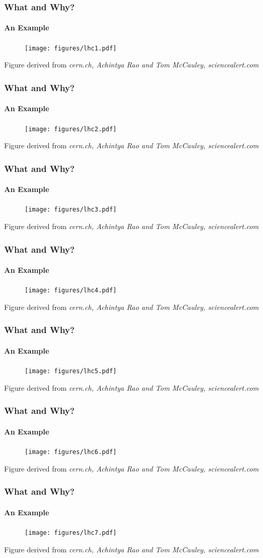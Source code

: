 \documentclass[9pt]{beamer}
\begin{document}
\begin{frame}
\frametitle{What and Why?}
\framesubtitle{An Example}
	\begin{figure}
	\texttt{[image: figures/lhc1.pdf]}
\end{figure}
\tiny Figure derived from \textit{cern.ch, Achintya Rao and Tom McCauley, sciencealert.com}
\end{frame}
\begin{frame}
\frametitle{What and Why?}
\framesubtitle{An Example}
\begin{figure}
	\texttt{[image: figures/lhc2.pdf]}
\end{figure}
\tiny Figure derived from \textit{cern.ch, Achintya Rao and Tom McCauley, sciencealert.com}
\end{frame}
\begin{frame}
\frametitle{What and Why?}
\framesubtitle{An Example}
\begin{figure}
\texttt{[image: figures/lhc3.pdf]}
\end{figure}
\tiny Figure derived from \textit{cern.ch, Achintya Rao and Tom McCauley, sciencealert.com}
\end{frame} \begin{frame}
\frametitle{What and Why?}
\framesubtitle{An Example}
\begin{figure}
\texttt{[image: figures/lhc4.pdf]}
\end{figure}
\tiny Figure derived from \textit{cern.ch, Achintya Rao and Tom McCauley, sciencealert.com}
\end{frame} \begin{frame}
\frametitle{What and Why?}
\framesubtitle{An Example}
\begin{figure}
\texttt{[image: figures/lhc5.pdf]}
\end{figure}
\tiny Figure derived from \textit{cern.ch, Achintya Rao and Tom McCauley, sciencealert.com}
\end{frame} \begin{frame}
\frametitle{What and Why?}
\framesubtitle{An Example}
\begin{figure}
\texttt{[image: figures/lhc6.pdf]}
\end{figure}
\tiny Figure derived from \textit{cern.ch, Achintya Rao and Tom McCauley, sciencealert.com}
\end{frame} \begin{frame}
\frametitle{What and Why?}
\framesubtitle{An Example}
\begin{figure}
\texttt{[image: figures/lhc7.pdf]}
\end{figure}
\tiny Figure derived from \textit{cern.ch, Achintya Rao and Tom McCauley, sciencealert.com}
\end{frame} 
\end{document}
